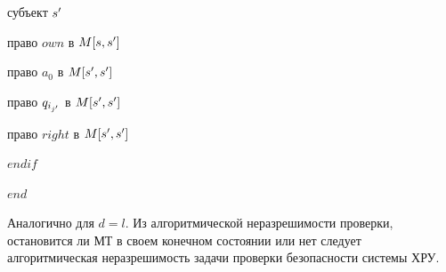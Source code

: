 \begin{proofs}
\begin{dokvo}
\begin{multicols}{2}
\begin{itemize*}
					 субъект $s^{\prime}$

					 право $own$ в $M[s,s^{\prime}]$

					 право $a_0$ в $M[s^{\prime},s^{\prime}]$

					 право $q_{i_{j^{\prime}}}$ в $M[s^{\prime},s^{\prime}]$

					 право $right$ в $M[s^{\prime},s^{\prime}]$

					$endif$

					$end$
			\end{itemize*}
		\end{multicols}




		Аналогично для $d = l$. Из алгоритмической неразрешимости проверки, остановится ли МТ в своем конечном состоянии или нет следует
		алгоритмическая неразрешимость задачи проверки безопасности системы ХРУ.
	\end{dokvo}
\end{proofs}
\newpage
